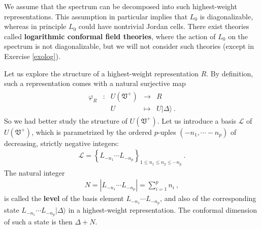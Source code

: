 \documentclass[12pt, a4paper, notitlepage, twoside]{report}
\numberwithin{equation}{section}
\theoremstyle{break}
\begin{document}
We assume that the spectrum can be decomposed into such highest-weight representations.
This assumption in particular implies that $L_0$ is diagonalizable, whereas in principle $L_0$ could have nontrivial Jordan cells.
There exist theories called \textbf{\boldmath logarithmic conformal field theories}, where the action of $L_0$ on the spectrum is not diagonalizable, but we will not consider such theories (except in Exercise \ref{exolog}).

Let us explore the structure of a highest-weight representation $R$.
By definition, such a representation comes with a natural surjective map
\begin{align}
\begin{array}{cclcl}
 \varphi_R & : & U(\mathfrak{V}^+) & \rightarrow & R 
\\
 &  & U & \mapsto & U|\Delta\rangle \ .
\end{array}
\label{pur}
\end{align}
So we had better study the structure of $U(\mathfrak{V}^+)$.
Let us introduce a basis $\mathcal{L}$ of $U(\mathfrak{V}^+)$, which is parametrized by the ordered $p$-uples $(-n_1,\cdots -n_p)$ of decreasing, strictly negative integers:
\begin{align}
\mathcal{L} =   \left\{ L_{-n_1} \cdots L_{-n_p}  \right\}_{1\leq n_1\leq n_2\leq \cdots n_p} \ .
\label{lels}
\end{align}
The natural integer
\begin{align}
 N=\left|L_{-n_1} \cdots L_{-n_p}\right|=\sum_{i=1}^p n_i \ ,
\label{nsn}
\end{align}
is called the \textbf{level} of the basis element $L_{-n_1} \cdots L_{-n_p}$, and also of the corresponding state $L_{-n_1} \cdots L_{-n_p}|\Delta\rangle$ in a highest-weight representation.
The conformal dimension of such a state is then $\Delta+N$. 
\end{document}
